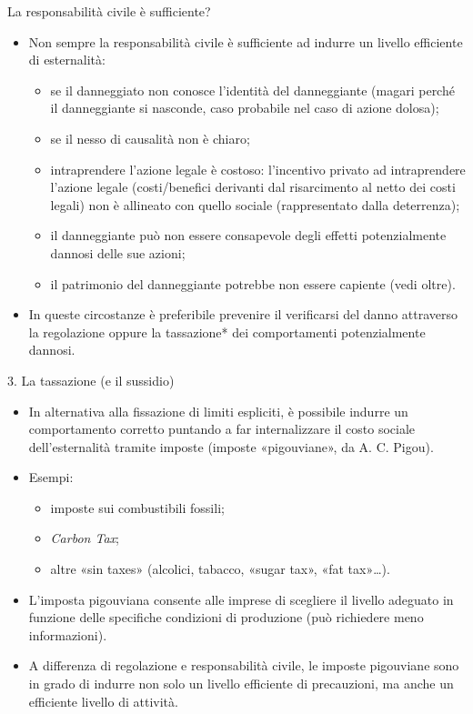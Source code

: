 \documentclass[aspectratio=64,11pt]{beamer}
\begin{document}
\begin{frame}{La responsabilità civile è sufficiente?}
\begin{itemize}
\item Non sempre la responsabilità civile è sufficiente ad indurre un livello
efficiente di esternalità:
\begin{itemize}
\item se il danneggiato non conosce l'identità del danneggiante (magari perché il
danneggiante si nasconde, caso probabile nel caso di azione dolosa);
\item se il nesso di causalità non è chiaro;
\item intraprendere l'azione legale è costoso: l'incentivo privato ad
intraprendere l'azione legale (costi/benefici derivanti dal risarcimento al
netto dei costi legali) non è allineato con quello sociale (rappresentato
dalla deterrenza);
\item il danneggiante può non essere consapevole degli effetti potenzialmente
dannosi delle sue azioni;
\item il patrimonio del danneggiante potrebbe non essere capiente (vedi oltre).
\end{itemize}
\item In queste circostanze è preferibile \alert{prevenire} il verificarsi del danno
attraverso la regolazione oppure la tassazione* dei comportamenti
potenzialmente dannosi.
\end{itemize}
\end{frame}

\begin{frame}{3. La tassazione (e il sussidio)}
\begin{itemize}
\item In alternativa alla fissazione di limiti espliciti, è possibile indurre un
comportamento corretto puntando a far internalizzare il costo sociale
dell'esternalità tramite imposte (imposte «pigouviane», da A. C. Pigou).
\item Esempi:
\begin{itemize}
\item imposte sui combustibili fossili;
\item \emph{Carbon Tax};
\item altre «sin taxes» (alcolici, tabacco, «sugar tax», «fat tax»\ldots{}).
\end{itemize}
\item L'imposta pigouviana consente alle imprese di scegliere il livello adeguato
in funzione delle specifiche condizioni di produzione (può richiedere meno
informazioni).
\item A differenza di regolazione e responsabilità civile, le imposte pigouviane
sono in grado di indurre non solo un livello efficiente di precauzioni, ma
anche un efficiente \alert{livello di attività}.
\end{itemize}
\end{frame}
\end{document}

